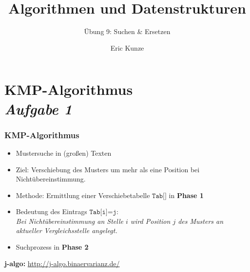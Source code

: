 \documentclass{beamer}
\begin{document}
	
	\title{Algorithmen und Datenstrukturen}
	\subtitle{Übung 9: Suchen \& Ersetzen}
	\author{Eric Kunze}
	\date{}

	\maketitle



\section{KMP-Algorithmus \\ \textit{Aufgabe 1}} 

\begin{frame} \frametitle{KMP-Algorithmus}
	\begin{itemize}
		\item Mustersuche in (großen) Texten
		\item Ziel: Verschiebung des Musters um mehr als eine Position bei Nichtübereinstimmung.
		\item Methode: Ermittlung einer Verschiebetabelle {\large $\texttt{Tab[]}$} in \textbf{Phase 1}
		\item Bedeutung des Eintrags {\large $\texttt{Tab[i]=j}$}: \\
		\textit{Bei Nichtübereinstimmung an Stelle $i$ wird Position $j$ des Musters an aktueller Vergleichsstelle angelegt.}
		\item Suchprozess in \textbf{Phase 2}
	\end{itemize}

	\textbf{j-algo:} \url{http://j-algo.binaervarianz.de/}
\end{frame}
\end{document}
